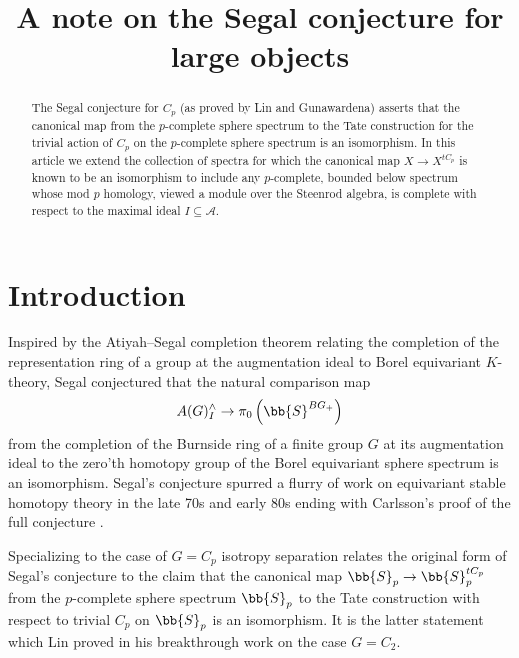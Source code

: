 
\title{A note on the Segal conjecture for large objects}
\maketitle

\begin{abstract}
    The Segal conjecture for $C_p$ (as proved by Lin and Gunawardena) asserts that the canonical map from the $p$-complete sphere spectrum to the Tate construction for the trivial action of $C_p$ on the $p$-complete sphere spectrum is an isomorphism. 
    In this article we extend the collection of spectra for which the canonical map $X \to X^{tC_p}$ is known to be an isomorphism to include any $p$-complete, bounded below spectrum whose mod $p$ homology, viewed a module over the Steenrod algebra, is complete with respect to the maximal ideal $I \subseteq \mathcal{A}$. 
\end{abstract}


\section{Introduction}


Inspired by the Atiyah--Segal completion theorem relating the completion of the representation ring of a group at the augmentation ideal to Borel equivariant $K$-theory, Segal conjectured that the natural comparison map
$$A(G)^{\wedge}_{I} \to \pi_{0}\left( \bb{S}^{BG_{+}} \right) $$
from the completion of the Burnside ring of a finite group $G$ at its augmentation ideal to 
the zero'th homotopy group of the Borel equivariant sphere spectrum is an isomorphism.
Segal's conjecture spurred a flurry of work on equivariant stable homotopy theory in the late 70s and early 80s \cite{lin1980conjectures, lin1980calculation, gunawardena1980segal, mayMcClure, ravenel1984segal, AGM} ending with Carlsson's proof of the full conjecture \cite{carlsson1984equivariant}.






Specializing to the case of $G = C_p$ isotropy separation relates the original form of Segal's conjecture to the claim that the canonical map $\bb{S}_p \rightarrow \bb{S}_p^{tC_p}$ from the $p$-complete sphere spectrum $\bb{S}_p$ to the Tate construction with respect to trivial $C_p$ on $\bb{S}_p$ is an isomorphism.
It is the latter statement which Lin proved in his breakthrough work \cite{lin1980conjectures} on the case $G=C_2$.

